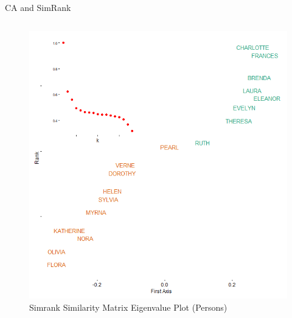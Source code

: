 \documentclass[
  ignorenonframetext,
]{beamer}
\begin{document}
\begin{frame}{CA and SimRank}
\begin{columns}[T]
\begin{column}{0.5\textwidth}
\begin{figure}
{\centering \includegraphics{Plots/sr-plot-eigen-p.png}

}

\caption{Simrank Similarity Matrix Eigenvalue Plot (Persons)}

\end{figure}
\end{column}
\end{columns}
\end{frame}
\end{document}
